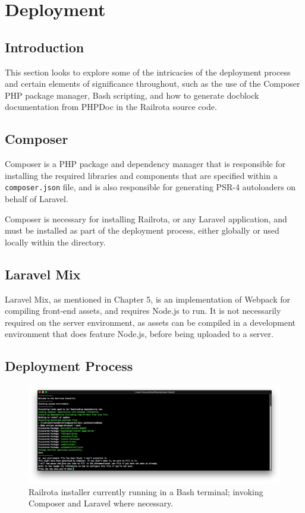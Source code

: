 \chapter{Deployment}

\section{Introduction}
This section looks to explore some of the intricacies of the deployment process and certain elements of significance throughout, such as the use of the Composer PHP package manager, Bash scripting, and how to generate docblock documentation from PHPDoc in the Railrota source code.

\section{Composer}
Composer is a PHP package and dependency manager that is responsible for installing the required libraries and components that are specified within a \texttt{composer.json} file, and is also responsible for generating PSR-4 autoloaders on behalf of Laravel. \cite{Composer1} \cite{PSR1}

Composer is necessary for installing Railrota, or any Laravel application, and must be installed as part of the deployment process, either globally or used locally within the directory.

\section{Laravel Mix}
Laravel Mix, as mentioned in Chapter 5, is an implementation of Webpack for compiling front-end assets, and requires Node.js to run. It is not necessarily required on the server environment, as assets can be compiled in a development environment that does feature Node.js, before being uploaded to a server. \cite{Laravel2}

\section{Deployment Process}

\begin{figure}[!ht]
    \includegraphics[width=\textwidth]{Figures/installer}
    \caption{Railrota installer currently running in a Bash terminal; invoking Composer and Laravel where necessary.}
    \label{fig:installer}
\end{figure}

